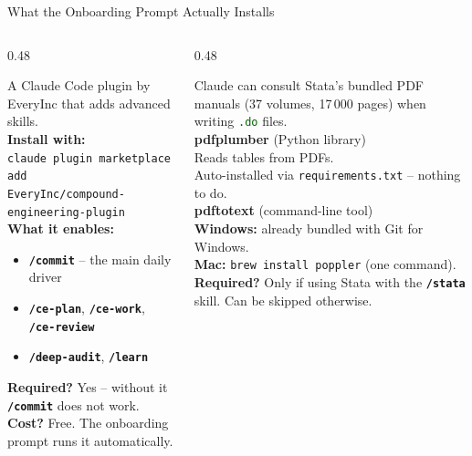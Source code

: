 \documentclass[aspectratio=169,11pt,dvipsnames]{beamer}
\newcommand{\skill}[1]{\texttt{\textcolor{defaultclr}{\textbf{/#1}}}}
\newcommand{\file}[1]{\textcolor{darkgreen}{\nolinkurl{#1}}}
\begin{document}
\begin{frame}{What the Onboarding Prompt Actually Installs}
\scriptsize
  \begin{columns}[T]
    \begin{column}{0.48\textwidth}
      \begin{greenbox}[title=Compound Engineering Plugin]
        \small
        A Claude Code plugin by EveryInc that adds advanced skills.\\[0.3cm]
        \textbf{Install with:}\\
        \texttt{claude plugin marketplace add}\\
        \texttt{EveryInc/compound-engineering-plugin}\\[0.3cm]
        \textbf{What it enables:}
        \begin{itemize}
          \item \skill{commit} -- the main daily driver
          \item \skill{ce-plan}, \skill{ce-work}, \skill{ce-review}
          \item \skill{deep-audit}, \skill{learn}
        \end{itemize}
        \textbf{Required?} Yes -- without it \skill{commit} does not work.\\
        \textbf{Cost?} Free. The onboarding prompt runs it automatically.
      \end{greenbox}
    \end{column}
    \begin{column}{0.48\textwidth}
      \begin{greenbox}[title=PDF Reading Tools (Stata manuals)]
        \small
        Claude can consult Stata's bundled PDF manuals
        (37 volumes, 17\,000 pages) when writing \file{.do} files.\\[0.3cm]
        \textbf{pdfplumber} (Python library)\\
        \quad Reads tables from PDFs.\\
        \quad Auto-installed via \texttt{requirements.txt} -- nothing to do.\\[0.3cm]
        \textbf{pdftotext} (command-line tool)\\
        \quad \textbf{Windows:} already bundled with Git for Windows.\\
        \quad \textbf{Mac:} \texttt{brew install poppler} (one command).\\[0.3cm]
        \textbf{Required?} Only if using Stata with the \skill{stata} skill.
        Can be skipped otherwise.
      \end{greenbox}
    \end{column}
  \end{columns}
\end{frame}
\end{document}
